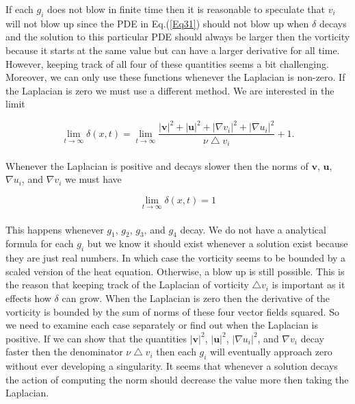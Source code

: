 \documentclass[amsmath,12pt,a4paper]{amsart}
\begin{document}
If each $g_i$ does not blow in finite time then it is reasonable to speculate that $v_i$ will not blow up since the PDE in Eq.(\ref{Eq31}) should not blow up when $\delta$ decays and the solution to this particular PDE should always be larger then the vorticity because it starts at the same value but can have a larger derivative for all time. However, keeping track of all four of these quantities seems a bit challenging. Moreover, we can only use these functions whenever the Laplacian is non-zero. If the Laplacian is zero we must use a different method. We are interested in the limit 

\begin{equation}\label{Eq32}
\lim_{t\rightarrow \infty}{\delta(x,t)} = \lim_{t\rightarrow \infty}{\dfrac{|\textbf{v}|^2+ |\textbf{u}|^2+|\nabla v_i|^2+|\nabla u_i|^2}{\nu \bigtriangleup v_i}}+1.
\end{equation} \\

Whenever the Laplacian is positive and decays slower then the norms of $\textbf{v}$, $\textbf{u}$, $\nabla u_i$, and $\nabla v_i$ we must have


\begin{equation}\label{Eq33}
\lim_{t\rightarrow \infty}{\delta(x,t)} = 1
\end{equation} \\

This happens whenever $g_1$, $g_2$, $g_3$, and $g_4$ decay. We do not have a analytical formula for each $g_i$ but we know it should exist whenever a solution exist because they are just real numbers. In which case the vorticity seems to be bounded by a scaled version of the heat equation. Otherwise, a blow up is still possible. This is the reason that keeping track of the Laplacian of vorticity $\bigtriangleup v_i$ is important as it effects how $\delta$ can grow. When the Laplacian is zero then the derivative of the vorticity is bounded by the sum of norms of these four vector fields squared. So we need to examine each case separately or find out when the Laplacian is positive. If we can show that the quantities $|\textbf{v}|^2$, $|\textbf{u}|^2$, $|\nabla u_i|^2$, and $\nabla v_i$ decay faster then the denominator $\nu\bigtriangleup v_i$ then each $g_i$ will eventually approach zero without ever developing a singularity. It seems that whenever a solution decays the action of computing the norm should decrease the value more then taking the Laplacian. 
\end{document}
